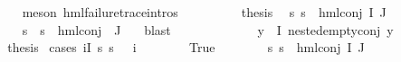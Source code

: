 \begin{isabellebody}
\ \ \ \ \ \ \ \ \isamarkupfalse%
\ {\isacharparenleft}{\kern0pt}meson\ hml{\isacharunderscore}{\kern0pt}failure{\isacharunderscore}{\kern0pt}trace{\isachardot}{\kern0pt}intros{\isacharparenleft}{\kern0pt}{}{\isacharparenright}{\kern0pt}{\isacharparenright}{\kern0pt}\isanewline
\ \ \ \ \ \ \isamarkupfalse%
\ \isamarkupfalse%
\ {\isacharquery}{\kern0pt}thesis\ \isamarkupfalse%
\ {\isacartoucheopen}{\isasymforall}s{\isachardot}{\kern0pt}\ {\isasymnot}s\ {\isasymTurnstile}\ {\isacharparenleft}{\kern0pt}hml{\isacharunderscore}{\kern0pt}conj\ I\ J\ {\isasymPhi}{\isacharparenright}{\kern0pt}{\isacartoucheclose}\ \isanewline
\ \ \ \ \ \ \ \ \isamarkupfalse%
\ {\isacartoucheopen}{\isasymforall}s{\isachardot}{\kern0pt}\ {\isasymnot}\ s\ {\isasymTurnstile}\ hml{\isacharunderscore}{\kern0pt}conj\ {\isacharbraceleft}{\kern0pt}{\isacharbraceright}{\kern0pt}\ J\ {\isasymPsi}{\isacartoucheclose}\ \isamarkupfalse%
\ blast\isanewline
\ \ \ \ \isamarkupfalse%
\isanewline
\ \ \isamarkupfalse%
\isanewline
{}\isamarkupfalse%
\isanewline
\ \ \ \ \isamarkupfalse%
\ {\isachardoublequoteopen}{\isasymforall}y{\isasymin}{\isasymPhi}\ {\isacharbackquote}{\kern0pt}\ I{\isachardot}{\kern0pt}\ nested{\isacharunderscore}{\kern0pt}empty{\isacharunderscore}{\kern0pt}conj\ y{\isachardoublequoteclose}\isanewline
\ \ \ \ \isamarkupfalse%
\ \isamarkupfalse%
\ {\isacharquery}{\kern0pt}thesis\ \isamarkupfalse%
{\isacharparenleft}{\kern0pt}cases\ {\isachardoublequoteopen}{\isasymexists}i{\isasymin}I{\isachardot}{\kern0pt}\ {\isacharparenleft}{\kern0pt}{\isasymforall}s{\isachardot}{\kern0pt}\ {\isacharparenleft}{\kern0pt}{\isasymnot}{\isacharparenleft}{\kern0pt}s\ {\isasymTurnstile}\ {\isacharparenleft}{\kern0pt}{\isasymPhi}\ i{\isacharparenright}{\kern0pt}{\isacharparenright}{\kern0pt}{\isacharparenright}{\kern0pt}{\isacharparenright}{\kern0pt}{\isachardoublequoteclose}{\isacharparenright}{\kern0pt}\isanewline
\ \ \ \ \ \ \isamarkupfalse%
\ True\isanewline
\ \ \ \ \ \ \isamarkupfalse%
\ {\isachardoublequoteopen}{\isasymforall}s{\isachardot}{\kern0pt}\ {\isacharparenleft}{\kern0pt}{\isasymnot}{\isacharparenleft}{\kern0pt}s\ {\isasymTurnstile}\ hml{\isacharunderscore}{\kern0pt}conj\ I\ J\ {\isasymPhi}{\isacharparenright}{\kern0pt}{\isacharparenright}{\kern0pt}{\isachardoublequoteclose}\ \isanewline
\ \ \ \ \ \ \ \ \isamarkupfalse%

\end{isabellebody}
